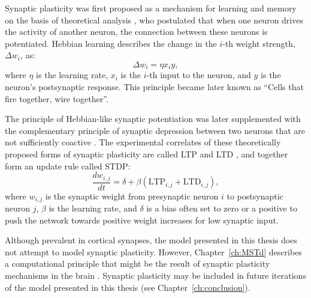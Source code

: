 Synaptic plasticity was first proposed as a mechanism 
for learning and memory on the basis of theoretical analysis 
\citep{Hebb1949}, who postulated that when one neuron drives the
activity of another neuron, the connection between these neurons is
potentiated.
Hebbian learning describes the change in the $i$-th weight strength, 
$\Delta w_i$, as:
\begin{equation}
\Delta w_i = \eta x_i y, \label{eqn:BKG|plasticity|Hebb}
\end{equation}
where $\eta$ is the learning rate, $x_i$ is the $i$-th input to the neuron,
and $y$ is the neuron's postsynaptic response.
This principle became later known as 
``Cells that fire together, wire together''.

The principle of Hebbian-like synaptic potentiation was later
supplemented with the complementary principle of synaptic depression
between two neurons that are not sufficiently coactive
\citep{Stent1973,Sejnowski1977}.
The experimental correlates of these theoretically proposed forms
of synaptic plasticity are called \acf{LTP} and \acf{LTD}
\citep{Song2000,BiPoo2001}, and together
form an update rule called \acf{STDP}:
\begin{equation}
\frac{dw_{i,j}}{dt} = \delta + \beta(\mathrm{LTP}_{i,j} + \mathrm{LTD}_{i,j}),
\label{eqn:BKG|plasticity|STDP}
\end{equation}
where $w_{i,j}$ is the synaptic weight from presynaptic neuron $i$ to
postsynaptic neuron $j$, 
$\beta$ is the learning rate, and
$\delta$ is a bias often set to zero or a positive to push the network towards
positive weight increases for low synaptic input.

Although prevalent in cortical synapses, the model presented in this
thesis does not attempt to model synaptic plasticity.
However, Chapter~\ref{ch:MSTd} describes a computational principle that might
be the result of synaptic plasticity mechanisms in the brain
\citep{Carlson2013}.
Synaptic plasticity may be included in future iterations of the model
presented in this thesis (see Chapter~\ref{ch:conclusion}).

